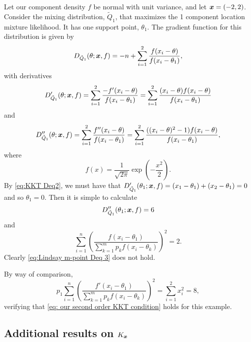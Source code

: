 	Let our component density $f$ be normal with unit variance, and let ${\bm{{x}}} = (-2,2)$. Consider the mixing distribution, $\tilde{Q}_1$, that maximizes the 1 component location mixture likelihood. It has one support point, $\theta_1$. The gradient function for this distribution is given by
	\begin{equation}
		D_{\tilde{Q}_1}(\theta;{\bm{{x}}}, f) = -n + \sum_{i = 1}^2 \frac{f(x_i - \theta)}{f(x_i - \theta_1)},
	\end{equation}
	with derivatives
	\begin{equation}
		D_{\tilde{Q}_1}'(\theta;{\bm{{x}}}, f) = \sum_{i = 1}^2 \frac{-f'(x_i - \theta)}{f(x_i - \theta_1)} = \sum_{i = 1}^2 \frac{(x_i - \theta) f(x_i - \theta)}{f(x_i - \theta_1)}
	\end{equation}
	and
	\begin{equation}
		D_{\tilde{Q}_1}''(\theta;{\bm{{x}}}, f) = \sum_{i = 1}^2 \frac{f''(x_i - \theta)}{f(x_i - \theta_1)} = \sum_{i = 1}^2 \frac{((x_i - \theta)^2 - 1)f(x_i - \theta)}{f(x_i - \theta_1)},
	\end{equation}
	where
	\begin{equation}
		f(x) = \frac{1}{\sqrt{2 \pi}} \exp\left(-\frac{x^2}{2}\right).
	\end{equation}
	By \eqref{eq:KKT Deq2}, we must have that $D'_{\tilde{Q}_1}(\theta_1;{\bm{{x}}}, f) = (x_1 - \theta_1) + (x_2 - \theta_1) = 0$ and so $\theta_1 = 0$. Then it is simple to calculate
	\begin{equation}
		D_{\tilde{Q}_1}''(\theta_1;{\bm{{x}}}, f) = 6
	\end{equation}
	and
	\begin{equation}
		\sum_{i = 1}^n \left(\frac{f(x_i - \theta_1)}{\sum_{k = 1}^m p_k f(x_i - \theta_k)}\right)^2 = 2.
	\end{equation}
	Clearly \eqref{eq:Lindsay m-point Deq 3} does not hold. 

	By way of comparison, 
	\begin{equation}
		p_1 \sum_{i = 1}^n \left(\frac{f'(x_i - \theta_1)}{\sum_{k = 1}^m p_k f(x_i - \theta_k)}\right)^2 = \sum_{i = 1}^2 x_i^2 = 8,
	\end{equation}
	verifying that \eqref{eq: our second order KKT condition} holds for this example.


	\subsection{Additional results on \texorpdfstring{$K_{\bm{{x}}}$}{Kx}}

